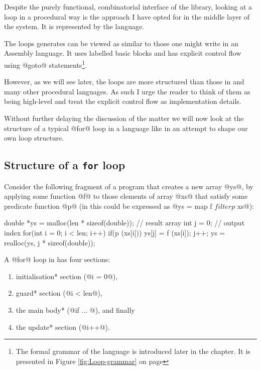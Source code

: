 \documentclass[preamble.tex]{subfiles}
\begin{document}
Despite the purely functional, combinatorial interface of the library, looking at a loop in a procedural way is the approach I have opted for in the middle layer of the system. It is represented by the \Loop language.\iloop

The loops \LiveFusion generates can be viewed as similar to those one might write in an Assembly language. It uses labelled basic blocks and has explicit control flow using @goto@ statements\footnote{The formal grammar of the \Loop language is introduced later in the chapter. It is presented in Figure \ref{fig:Loop-grammar} on page \pageref{fig:Loop-grammar}}.

However, as we will see later, the loops are more structured than those in \C and many other procedural languages. As such I urge the reader to think of them as being high-level and treat the explicit control flow as implementation details.


Without further delaying the discussion of the matter we will now look at the structure of a typical @for@ loop in a language like \C in an attempt to shape our own loop structure.


\subsection{Structure of a \texttt{for} loop}

Consider the following fragment of a \C program that creates a new array @ys@, by applying some function @f@ to those elements of array @xs@ that satisfy some predicate function @p@ (in \Haskell this could be expressed as @ys = map f $ filter p $ xs@):

\begin{ccode}[numbers=left, label=lst:filterMapC]
double *ys = malloc(len * sizeof(double)); // result array
int j = 0;                                 // output index
for(int i = 0; i < len; i++) {
    if(p (xs[i])) {
        ys[j] = f (xs[i]);
        j++;
    }
}
ys = realloc(ys, j * sizeof(double));
\end{ccode}

A @for@ loop in \C has four sections:

\begin{enumerate}
\halfspacing
\item \*initialisation* section (@i = 0@),
\item \*guard* section (@i < len@),
\item the main \*body* (@if ... @), and finally
\item the \*update* section (@i++@).
\end{enumerate}
\end{document}
